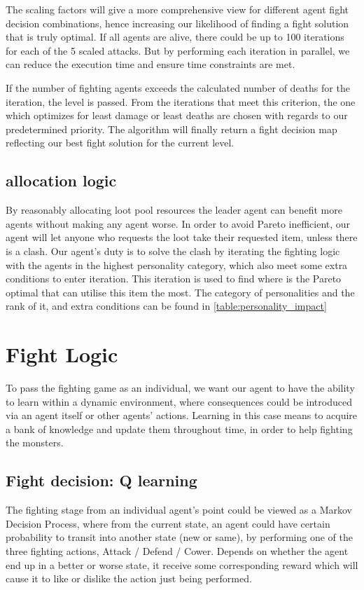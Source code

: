 The scaling factors will give a more comprehensive view for different agent fight decision combinations, hence increasing our likelihood of finding a fight solution that is truly optimal. If all agents are alive, there could be up to 100 iterations for each of the 5 scaled attacks. But by performing each iteration in parallel, we can reduce the execution time and ensure time constraints are met.

If the number of fighting agents exceeds the calculated number of deaths for the iteration, the level is passed. From the iterations that meet this criterion, the one which optimizes for least damage or least deaths are chosen with regards to our predetermined priority. The algorithm will finally return a fight decision map reflecting our best fight solution for the current level.

\subsection{allocation logic}
By reasonably allocating loot pool resources the leader agent can benefit more agents without making any agent worse. In order to avoid Pareto inefficient, our agent will let anyone who requests the loot take their requested item, unless there is a clash. Our agent's duty is to solve the clash by iterating the fighting logic with the agents in the highest personality category, which also meet some extra conditions to enter iteration. This iteration is used to find where is the Pareto optimal that can utilise this item the most. The category of personalities and the rank of it, and extra conditions can be found in \ref{table:personality_impact}




\section{Fight Logic}
To pass the fighting game as an individual, we want our agent to have the ability to learn within a dynamic environment, where consequences could be introduced via an agent itself or other agents' actions. Learning in this case means to acquire a bank of knowledge and update them throughout time, in order to help fighting the monsters.

\subsection{Fight decision: Q learning}
The fighting stage from an individual agent's point could be viewed as a Markov Decision Process, where from the current state, an agent could have certain probability to transit into another state (new or same), by performing one of the three fighting actions, Attack / Defend / Cower. Depends on whether the agent end up in a better or worse state, it receive some corresponding reward which will cause it to like or dislike the action just being performed.


